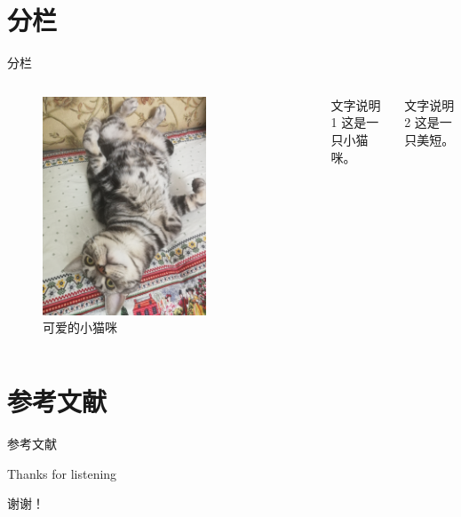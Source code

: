 \documentclass{beamer}
\begin{document}
\section{分栏}
\begin{frame}{分栏}
    \begin{columns}[c] %
        \begin{figure} [H] %
            \centering
            \includegraphics[width=0.7\textwidth]{./img/cat.jpg}
            \caption{可爱的小猫咪}
            \label{Fig.cat}
        \end{figure}
        \begin{block}{文字说明1}
            这是一只小猫咪。
        \end{block}
        \begin{block}{文字说明2}
            这是一只美短。
        \end{block}
    \end{columns}
\end{frame}


\section{参考文献}
\begin{frame}{参考文献}
    
\end{frame}

\begin{frame}{Thanks for listening}
    \begin{center}
        {\LARGE 谢谢！}
    \end{center}
\end{frame}
\end{document}
